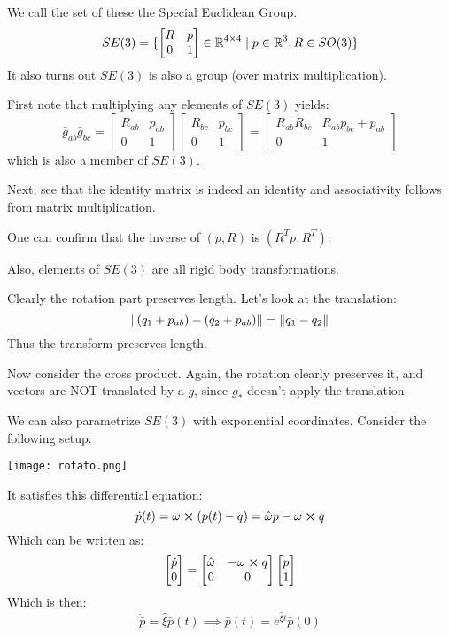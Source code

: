 We call the set of these the Special Euclidean Group.
\[ SE(3) = \{ \begin{bmatrix}
    R & p \\ 0 & 1 \end{bmatrix} \in \operatorname{\mathbb{R}}^{4 \times 4} \mid p \in \operatorname{\mathbb{R}}^3, R \in SO(3) \} \]
It also turns out $SE(3)$ is also a group (over matrix multiplication).
\begin{proof*}
    First note that multiplying any elements of $SE(3)$ yields:
    \[ \bar{g}_{ab} \bar{g}_{bc} = \begin{bmatrix}
        R_{ab} & p_{ab} \\ 0 & 1
    \end{bmatrix} \begin{bmatrix} R_{bc} & p_{bc} \\ 0 & 1 \end{bmatrix} = \begin{bmatrix}
        R_{ab} R_{bc} & R_{ab} p_{bc} + p_{ab} \\ 0 & 1
    \end{bmatrix} \]
    which is also a member of $SE(3)$.

    Next, see that the identity matrix is indeed an identity and associativity follows
    from matrix multiplication.

    One can confirm that the inverse of $(p, R)$ is $(R^T p, R^T)$.
\end{proof*}
Also, elements of $SE(3)$ are all rigid body transformations.
\begin{proof*}
    Clearly the rotation part preserves length. Let's look at the translation:
    \[ \norm{(q_1 + p_{ab}) - (q_2 + p_{ab})} = \norm{q_1 - q_2} \]
    Thus the transform preserves length.

    Now consider the cross product. Again, the rotation clearly preserves it,
    and vectors are NOT translated by a $g$, since $g_*$ doesn't apply the translation.
\end{proof*}

We can also parametrize $SE(3)$ with exponential coordinates.
Consider the following setup:

\texttt{[image: rotato.png]}

It satisfies this differential equation:
\[ \dot{p}(t) = \omega \cross (p(t) - q) = \hat{\omega} p - \omega \cross q \]
Which can be written as:
\[ \begin{bmatrix} \dot{p} \\ 0 \end{bmatrix} = \begin{bmatrix}
    \hat{\omega} & - \omega \cross q \\ 0 & 0
\end{bmatrix} \begin{bmatrix}
    p \\ 1
\end{bmatrix} \]
Which is then:
\[ \dot{\bar{p}} = \hat{\xi} \bar{p}(t) \implies \bar{p}(t) = e^{\hat{\xi} t} \bar{p}(0) \]
